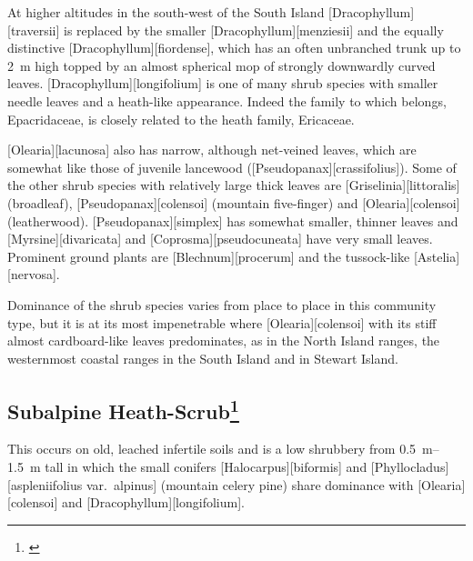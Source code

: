 At higher altitudes in the south-west of the South Island [Dracophyllum][traversii] is replaced by the smaller [Dracophyllum][menziesii] and the equally distinctive [Dracophyllum][fiordense], which has an often unbranched trunk up to \SI{2}{\metre} high topped by an almost spherical mop of strongly downwardly curved leaves. [Dracophyllum][longifolium] is one of many shrub species with smaller needle leaves and a heath-like appearance.
Indeed the family to which  belongs, Epacridaceae, is closely related to the heath family, Ericaceae.

[Olearia][lacunosa] also has narrow, although net-veined leaves, which are somewhat like those of juvenile lancewood ([Pseudopanax][crassifolius]).
Some of the other shrub species with relatively large thick leaves are [Griselinia][littoralis] (broadleaf), [Pseudopanax][colensoi] (mountain five-finger) and [Olearia][colensoi] (leatherwood). [Pseudopanax][simplex] has somewhat smaller, thinner leaves and [Myrsine][divaricata] and [Coprosma][pseudocuneata] have very small leaves.
Prominent ground plants are [Blechnum][procerum] and the tussock-like [Astelia][nervosa].

Dominance of the shrub species varies from place to place in this community type, but it is at its most impenetrable where [Olearia][colensoi] with its stiff almost cardboard-like leaves predominates, as in the North Island ranges, the westernmost coastal ranges in the South Island and in Stewart Island.

\subsection[Subalpine Heath-Scrub]{Subalpine Heath-Scrub\thinspace\footnote{\cite{burrows1979heathlands}}}

This occurs on old, leached infertile soils and is a low shrubbery from \SIrange{0.5}{1.5}{\metre} tall in which the small conifers [Halocarpus][biformis] and [Phyllocladus][aspleniifolius var.\ alpinus] (mountain celery pine) share dominance with [Olearia][colensoi] and [Dracophyllum][longifolium].

